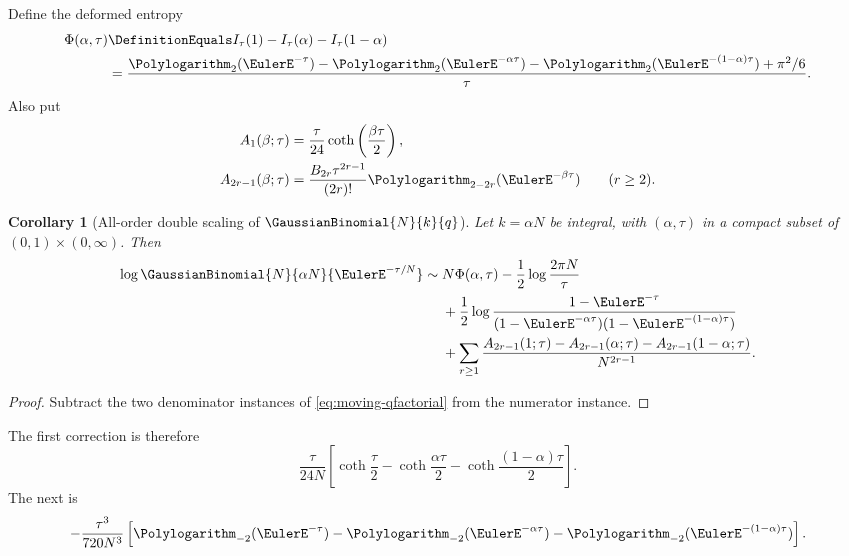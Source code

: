 \documentclass[11pt,oneside]{article}
\newtheorem{corollary}[theorem]{Corollary}
\theoremstyle{definition}
\theoremstyle{remark}
\newcommand{\cothh}{\operatorname{coth}}
\begin{document}
Define the deformed entropy
\begin{align}
 \Phi(\alpha,\tau)
 &\DefinitionEquals I_\tau(1)-I_\tau(\alpha)-I_\tau(1-\alpha)\notag\\
 &=\frac{\Polylogarithm_2(\EulerE^{-\tau})-\Polylogarithm_2(\EulerE^{-\alpha\tau})
 -\Polylogarithm_2(\EulerE^{-(1-\alpha)\tau})+\pi^2/6}{\tau}.
 \label{eq:deformed-entropy}
\end{align}
Also put
\begin{align}
 A_1(\beta;\tau)&=\frac{\tau}{24}
 \cothh\left(\frac{\beta\tau}{2}\right),\label{eq:A1-double}\\
 A_{2r-1}(\beta;\tau)&=
 \frac{B_{2r}\tau^{2r-1}}{(2r)!}
 \Polylogarithm_{2-2r}(\EulerE^{-\beta\tau})\qquad(r\ge2).
 \label{eq:Ar-double}
\end{align}

\begin{corollary}[All-order double scaling of $\GaussianBinomial{N}{k}{q}$]
\label{cor:double-gaussian}
Let $k=\alpha N$ be integral, with $(\alpha,\tau)$ in a compact subset of
$(0,1)\times(0,\infty)$.  Then
\begin{align}
 \log\GaussianBinomial{N}{\alpha N}{\EulerE^{-\tau/N}}
 \sim{}&N\Phi(\alpha,\tau)
 -\frac12\log\frac{2\pi N}{\tau}
 \notag\\
 &+\frac12\log
 \frac{1-\EulerE^{-\tau}}
 {(1-\EulerE^{-\alpha\tau})(1-\EulerE^{-(1-\alpha)\tau})}
 \notag\\
 &+\sum_{r\ge1}\frac{
 A_{2r-1}(1;\tau)-A_{2r-1}(\alpha;\tau)
 -A_{2r-1}(1-\alpha;\tau)}{N^{2r-1}}.
 \label{eq:double-gaussian}
\end{align}
\end{corollary}

\begin{proof}
Subtract the two denominator instances of
\eqref{eq:moving-qfactorial} from the numerator instance.
\end{proof}

The first correction is therefore
\begin{equation}\label{eq:double-first-correction}
 \frac{\tau}{24N}
 \left[
 \cothh\frac\tau2-
 \cothh\frac{\alpha\tau}{2}-
 \cothh\frac{(1-\alpha)\tau}{2}
 \right].
\end{equation}
The next is
\begin{equation}\label{eq:double-third-correction}
 -\frac{\tau^3}{720N^3}
 \left[
 \Polylogarithm_{-2}(\EulerE^{-\tau})-
 \Polylogarithm_{-2}(\EulerE^{-\alpha\tau})-
 \Polylogarithm_{-2}(\EulerE^{-(1-\alpha)\tau})
 \right].
\end{equation}
\end{document}
